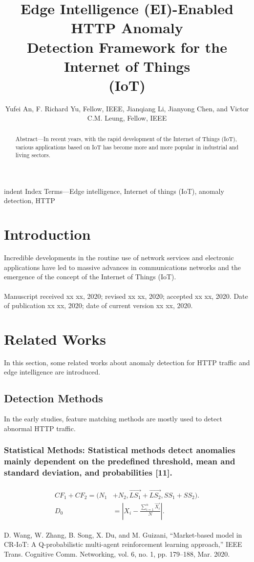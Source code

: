 \documentclass[journal]{IEEEtran}
\title{Edge Intelligence (EI)-Enabled HTTP Anomaly\\
Detection Framework for the Internet of Things\\
(IoT)}
\author{Yufei An, F. Richard Yu, Fellow, IEEE, Jianqiang Li, Jianyong Chen, and Victor C.M. Leung, Fellow, IEEE}
\begin{document}
\maketitle
\begin{abstract}
Abstract—In recent years, with the rapid development of the
Internet of Things (IoT), various applications based on IoT has
become more and more popular in industrial and living sectors.
\end{abstract}
\begin{IEEEkeywords}
indent Index Terms—Edge intelligence, Internet of things (IoT),
anomaly detection, HTTP
\end{IEEEkeywords}
\section{Introduction}
\IEEEPARstart{}\quad Incredible developments in the routine use of network services and electronic applications have led to massive advances
in communications networks and the emergence of the concept
of the Internet of Things (IoT).
\\ \\ \indent \footnotesize{  Manuscript received xx xx, 2020; revised xx xx, 2020; accepted xx xx,
2020. Date of publication xx xx, 2020; date of current version xx xx,
2020.}
\section{Related Works}
\IEEEPARstart{}\quad \normalsize In this section, some related works about anomaly detection
for HTTP traffic and edge intelligence are introduced.
\subsection{Detection Methods}
In the early studies, feature matching methods are mostly
used to detect abnormal HTTP traffic.
\subsubsection{Statistical Methods: Statistical methods detect anomalies mainly dependent on the predefined threshold, mean and
standard deviation, and probabilities [11].}

\begin{gather}
\begin{align}
CF_1+CF_2=(N_1&+N_2,\overrightarrow{LS_1}+\overrightarrow{LS_2},SS_1+SS_2). \\
           D_0&=|X_i-\frac{\sum^n_{i=1} \overrightarrow{X_i}}{N}|.
\end{align}
\end{gather}
\begin{thebibliography}{99}
D. Wang, W. Zhang, B. Song, X. Du, and M. Guizani, “Market-based
model in CR-IoT: A Q-probabilistic multi-agent reinforcement learning
approach,” IEEE Trans. Cognitive Comm. Networking, vol. 6, no. 1, pp.
179–188, Mar. 2020.
\end{thebibliography}
\end{document}
